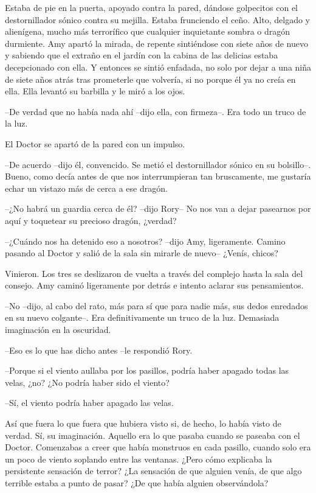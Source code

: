 {Estaba de pie en la puerta, apoyado contra la pared, dándose golpecitos
	con el destornillador sónico contra su mejilla. Estaba frunciendo el
	ceño. Alto, delgado y alienígena, mucho más terrorífico que cualquier
	inquietante sombra o dragón durmiente. Amy apartó la mirada, de repente
	sintiéndose con siete años de nuevo y sabiendo que el extraño en el
	jardín con la cabina de las delicias estaba decepcionado con ella. Y
	entonces se sintió enfadada, no solo por dejar a una niña de siete años
	atrás tras prometerle que volvería, si no porque él ya no creía en ella.
Ella levantó su barbilla y le miró a los ojos.}

{--De verdad que no había nada ahí --dijo ella, con firmeza--. Era
todo un truco de la luz.}

{El Doctor se apartó de la pared con un impulso.}

{--De acuerdo --dijo él, convencido. Se metió el destornillador sónico
	en su bolsillo--. Bueno, como decía antes de que nos interrumpieran tan
bruscamente, me gustaría echar un vistazo más de cerca a ese dragón.}

{--¿No habrá un guardia cerca de él? --dijo Rory-- No nos van a dejar
pasearnos por aquí y toquetear su precioso dragón, ¿verdad?}

{--¿Cuándo nos ha detenido eso a nosotros? --dijo Amy, ligeramente.
	Camino pasando al Doctor y salió de la sala sin mirarle de nuevo--
¿Venís, chicos?}

{Vinieron. Los tres se deslizaron de vuelta a través del complejo hasta
	la sala del consejo. Amy caminó ligeramente por detrás e intento aclarar
sus pensamientos.}

{--No --dijo, al cabo del rato, más para sí que para nadie más, sus
	dedos enredados en su nuevo colgante--. Era definitivamente un truco de
la luz. Demasiada imaginación en la oscuridad.}

{--Eso es lo que has dicho antes --le respondió Rory.}

{--Porque si el viento aullaba por los pasillos, podría haber apagado
todas las velas, ¿no? ¿No podría haber sido el viento?}

{--Sí, el viento podría haber apagado las velas.}

{Así que fuera lo que fuera que hubiera visto si, de hecho, lo había
	visto de verdad. Sí, su imaginación. Aquello era lo que pasaba cuando se
	paseaba con el Doctor. Comenzabas a creer que había monstruos en cada
	pasillo, cuando solo era un poco de viento soplando entre las ventanas.
	¿Pero cómo explicaba la persistente sensación de terror? ¿La sensación
	de que alguien venía, de que algo terrible estaba a punto de pasar? ¿De
que había alguien observándola?}

